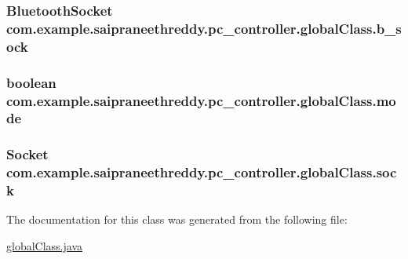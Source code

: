 \subsubsection[{\texorpdfstring{b\+\_\+sock}{b_sock}}]{\setlength{\rightskip}{0pt plus 5cm}Bluetooth\+Socket com.\+example.\+saipraneethreddy.\+pc\+\_\+controller.\+global\+Class.\+b\+\_\+sock}\hypertarget{classcom_1_1example_1_1saipraneethreddy_1_1pc__controller_1_1globalClass_a5afb13e514f941ad944a8e3c56be6046}{}\label{classcom_1_1example_1_1saipraneethreddy_1_1pc__controller_1_1globalClass_a5afb13e514f941ad944a8e3c56be6046}
\subsubsection[{\texorpdfstring{mode}{mode}}]{\setlength{\rightskip}{0pt plus 5cm}boolean com.\+example.\+saipraneethreddy.\+pc\+\_\+controller.\+global\+Class.\+mode}\hypertarget{classcom_1_1example_1_1saipraneethreddy_1_1pc__controller_1_1globalClass_ae3ed7986be302d5623c3d5aeafe67f59}{}\label{classcom_1_1example_1_1saipraneethreddy_1_1pc__controller_1_1globalClass_ae3ed7986be302d5623c3d5aeafe67f59}
\subsubsection[{\texorpdfstring{sock}{sock}}]{\setlength{\rightskip}{0pt plus 5cm}Socket com.\+example.\+saipraneethreddy.\+pc\+\_\+controller.\+global\+Class.\+sock}\hypertarget{classcom_1_1example_1_1saipraneethreddy_1_1pc__controller_1_1globalClass_af31445d851f57e68b3e3913d60fa0c11}{}\label{classcom_1_1example_1_1saipraneethreddy_1_1pc__controller_1_1globalClass_af31445d851f57e68b3e3913d60fa0c11}


The documentation for this class was generated from the following file\+:\begin{DoxyCompactItemize}
\item 
\hyperlink{globalClass_8java}{global\+Class.\+java}\end{DoxyCompactItemize}
